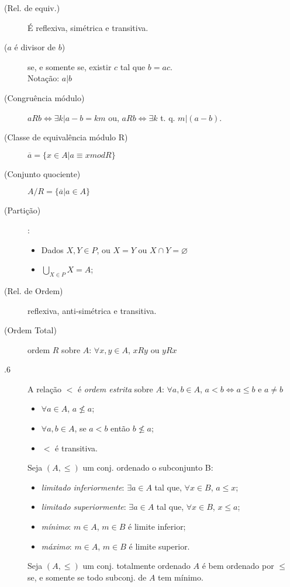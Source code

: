 \documentclass[11pt]{article}
\begin{document}
\begin{description}
  \item[ (Rel. de equiv.)] É reflexiva, simétrica e transitiva.
  \item[ ($a$ é divisor de $b$)] se, e somente se, existir $c$ tal que $b = ac$.  \\
    Notação: $a|b$
  \item[ (Congruência módulo)]
    $aRb \iff \exists k | a-b=km$ ou,
    $aRb \iff \exists k$ t. q. $m|(a-b)$.

  \item[ (Classe de equivalência módulo R)] $\overline{a} = \{ x \in A | a
    \equiv x mod R\}$
  \item[ (Conjunto quociente)] $A/R = \{ \overline{a} | a \in A \}$
  \item[ (Partição)]:
    \begin{itemize}
      \item Dados $X, Y \in P$, ou $X=Y$ ou $X\cap Y= \varnothing$
      \item $\bigcup\limits_{X \in P}X = A$;
    \end{itemize}
\end{description}


\begin{description}
  \item[ (Rel. de Ordem)] reflexiva, anti-simétrica e transitiva.
  \item[ (Ordem Total)] ordem $R$ sobre $A$:
    $\forall x,y \in A$, $xRy$ ou $yRx$
  \item[.6] A relação $<$ é \emph{ordem estrita} sobre $A$:
    $\forall a,b \in A$, $a < b \iff a \leq b$ e $a\neq b$

    \begin{itemize}
      \item $\forall a \in A$, $a \nleq a$;
      \item $\forall a,b \in A$, se $a<b$ então $b\nleq a$;
      \item $<$ é transitiva.
    \end{itemize}
  \item[] Seja $(A, \le)$ um conj. ordenado o subconjunto B:
    \begin{itemize}
      \item \emph{limitado inferiormente}: $\exists a \in A$ tal que, $\forall x
        \in B$, $a \leq x$;
      \item \emph{limitado superiormente}: $\exists a \in A$ tal que, $\forall x
        \in B$, $x \leq a$;
      \item \emph{mínimo}: $m \in A$, $m \in B$ é limite inferior;
      \item \emph{máximo}: $m \in A$, $m \in B$ é limite superior.
    \end{itemize}

  \item[] Seja $(A, \leq)$ um conj. totalmente ordenado $A$ é bem
    ordenado por $\leq$ se, e somente se todo subconj. de $A$ tem mínimo.
\end{description}
\end{document}
